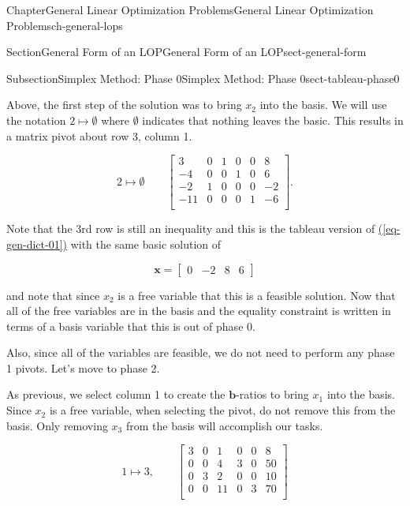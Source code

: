 \documentclass[oneside,10pt,]{book}
\newcommand{\xreffont}{\relax}
\numberwithin{equation}{section}
\newcommand{\amp}{&}
\begin{document}
\begin{chapterptx}{Chapter}{General Linear Optimization Problems}{}{General Linear Optimization Problems}{}{}{ch-general-lops}
\begin{sectionptx}{Section}{General Form of an LOP}{}{General Form of an LOP}{}{}{sect-general-form}
\begin{subsectionptx}{Subsection}{Simplex Method: Phase 0}{}{Simplex Method: Phase 0}{}{}{sect-tableau-phase0}
\par
Above, the first step of the solution was to bring \(x_2\) into the basis. We will use the notation \(2 \mapsto \emptyset\) where \(\emptyset\) indicates that nothing leaves the basic. This results in a matrix pivot about row 3, column 1.%
\par
%
\begin{equation*}
2 \mapsto \emptyset \qquad \left[\begin{array}{rr|rrr|r} 3 \amp 0 \amp 1 \amp 0 \amp 0 \amp 8\\ -4 \amp 0 \amp 0 \amp 1 \amp 0 \amp 6\\ -2 \amp 1 \amp 0 \amp 0 \amp 0 \amp -2\\ \hline -11 \amp 0 \amp 0 \amp 0 \amp 1 \amp -6\\ \end{array} \right].
\end{equation*}
%
\par
Note that the 3rd row is still an inequality and this is the tableau version of \hyperref[eq-gen-dict-01]{({\xreffont\ref{eq-gen-dict-01}})} with the same basic solution of%
\par
%
\begin{equation*}
\boldsymbol{x} = \left[\begin{array}{rr|rr} 0 \amp -2 \amp 8 \amp 6 \end{array}\right]
\end{equation*}
%
\par
and note that since \(x_2\) is a free variable that this is a feasible solution. Now that all of the free variables are in the basis and the equality constraint is written in terms of a basis variable that this is out of phase 0.%
\par
Also, since all of the variables are feasible, we do not need to perform any phase 1 pivots. Let's move to phase 2.%
\par
As previous, we select column 1 to  create the \(\boldsymbol{b}\)-ratios to bring \(x_1\) into the basis. Since \(x_2\) is a free variable, when selecting the pivot, do not remove this from the basis. Only removing \(x_3\) from the basis will accomplish our tasks.%
\par
%
\begin{equation*}
1 \mapsto 3, \qquad \left[\begin{array}{rr|rrr|r} 3 \amp 0 \amp 1 \amp 0 \amp 0 \amp 8\\ 0 \amp 0 \amp 4 \amp 3 \amp 0 \amp 50\\ 0 \amp 3 \amp 2 \amp 0 \amp 0 \amp 10\\ \hline 0 \amp 0 \amp 11 \amp 0 \amp 3 \amp 70\\ \end{array} \right]

\end{equation*}
\end{subsectionptx}
\end{sectionptx}
\end{chapterptx}
\end{document}

